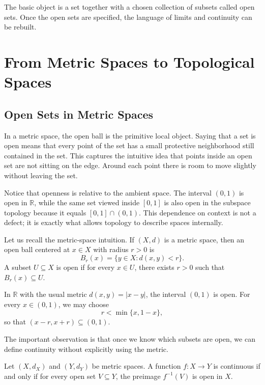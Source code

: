 The basic object is a set together with a chosen collection of subsets called open sets. Once the open sets are specified, the language of limits and continuity can be rebuilt.

\section{From Metric Spaces to Topological Spaces}

\subsection{Open Sets in Metric Spaces}


In a metric space, the open ball is the primitive local object. Saying that a set is open means that every point of the set has a small protective neighborhood still contained in the set. This captures the intuitive idea that points inside an open set are not sitting on the edge. Around each point there is room to move slightly without leaving the set.

Notice that openness is relative to the ambient space. The interval $(0,1)$ is open in $\mathbb{R}$, while the same set viewed inside $[0,1]$ is also open in the subspace topology because it equals $[0,1]\cap (0,1)$. This dependence on context is not a defect; it is exactly what allows topology to describe spaces internally.

Let us recall the metric-space intuition. If $(X,d)$ is a metric space, then an open ball centered at $x\in X$ with radius $r>0$ is
\[
    B_r(x)=\{y\in X:d(x,y)<r\}.
\]
A subset $U\subseteq X$ is open if for every $x\in U$, there exists $r>0$ such that $B_r(x)\subseteq U$.

\begin{example}
In $\mathbb{R}$ with the usual metric $d(x,y)=|x-y|$, the interval $(0,1)$ is open. For every $x\in(0,1)$, we may choose
\[
    r<\min\{x,1-x\},
\]
so that $(x-r,x+r)\subseteq(0,1)$.
\end{example}

The important observation is that once we know which subsets are open, we can define continuity without explicitly using the metric.

\begin{proposition}
Let $(X,d_X)$ and $(Y,d_Y)$ be metric spaces. A function $f:X\to Y$ is continuous if and only if for every open set $V\subseteq Y$, the preimage $f^{-1}(V)$ is open in $X$.
\end{proposition}

